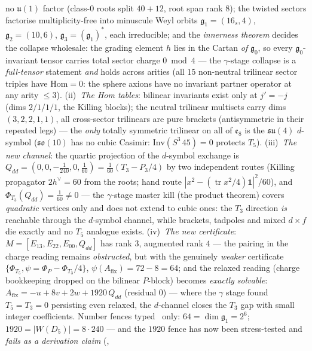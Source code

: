 no $\mathfrak u(1)$ factor (class-$0$ roots split $40{+}12$, root span rank $8$); the twisted
sectors factorise multiplicity-free into minuscule Weyl orbits $\mathfrak g_1=(16_s,4)$,
$\mathfrak g_2=(10,6)$, $\mathfrak g_3=(\mathfrak g_1)^*$, each irreducible; and the
\emph{innerness theorem} decides the collapse wholesale: the grading element $h$ lies in the
Cartan \emph{of} $\mathfrak g_0$, so every $\mathfrak g_0$-invariant tensor carries total sector
charge $0\bmod4$ --- the $\gamma$-stage collapse is a \emph{full-tensor} statement \emph{and}
holds across arities (all $15$ non-neutral trilinear sector triples have $\mathrm{Hom}=0$: the
sphere axions have no invariant partner operator at any arity $\le3$).
(ii)~\emph{The Hom tables}: bilinear invariants exist only at $j'=-j$ (dims $2/1/1/1$, the
Killing blocks); the neutral trilinear multisets carry dims $(3,2,2,1,1)$, all cross-sector
trilinears are pure brackets (antisymmetric in their repeated legs) --- the \emph{only} totally
symmetric trilinear on all of $\mathfrak e_8$ is the $\mathfrak{su}(4)$ $d$-symbol
($\mathfrak{so}(10)$ has no cubic Casimir: $\mathrm{Inv}(S^3\,45)=0$ protects $T_5$).
(iii)~\emph{The new channel}: the quartic projection of the $d$-symbol exchange is
$Q_{dd}=(0,0,-\tfrac1{240},0,\tfrac1{60})=\tfrac1{60}(T_3-P_3/4)$ by two independent routes
(Killing propagator $2h^\vee=60$ from the roots; hand route
$|x^2-(\operatorname{tr}x^2/4)\mathbf 1|^2/60$), and $\Phi_{T_3}(Q_{dd})=\tfrac1{60}\neq0$ ---
the $\gamma$-stage master kill (the product theorem) covers \emph{quadratic} vertices only and
does not extend to cubic ones: the $T_3$ direction \emph{is} reachable through the $d$-symbol
channel, while brackets, tadpoles and mixed $d{\times}f$ die exactly and no $T_5$ analogue
exists. (iv)~\emph{The new certificate}: $M=[E_{13},E_{22},E_{00},Q_{dd}]$ has rank $3$,
augmented rank $4$ --- the pairing in the charge reading remains \emph{obstructed}, but with the
genuinely \emph{weaker} certificate $\{\Phi_{T_5},\psi=\Phi_P-\Phi_{T_3}/4\}$,
$\psi(A_{\mathrm{fix}})=72-8=64$; and the relaxed reading (charge bookkeeping dropped on the
bilinear $P$-block) becomes \emph{exactly solvable}:
$A_{\mathrm{fix}}=-u+8v+2w+1920\,Q_{dd}$ (residual $0$) --- where the $\gamma$ stage found
$T_5=T_3=0$ persisting even relaxed, the $d$-channel closes the $T_3$ gap with small integer
coefficients. Number fences typed \mC\ only: $64=\dim\mathfrak g_1=2^6$;
$1920=|W(D_5)|=8\cdot240$ --- and the $1920$ fence has now been stress-tested and \emph{fails as a
derivation claim} (,
